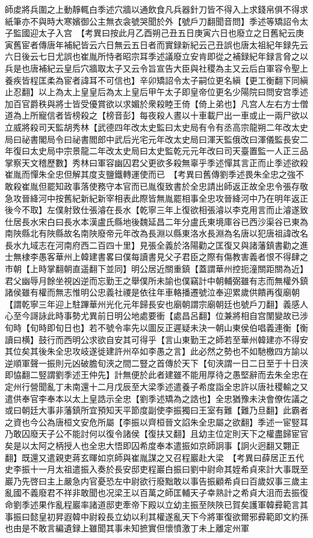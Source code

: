 師䖍將兵圍之上動靜輒白季述穴牆以通飲食凡兵器針刀皆不得入上求錢帛俱不得求紙筆亦不與時大寒嬪御公主無衣衾號哭聞於外【號戶刀翻聞音問】季述等矯詔令太子監國迎太子入宫　【考異曰按此月乙酉朔己丑五日庚寅六日也廢立之日舊紀云庚寅舊宦者傳唐年補紀皆云六日無云五日者而實録新紀云己丑誤也唐太祖紀年録先云六日後云七日尤誤也崔胤所恃者昭宗耳季述議廢立安肯即從之補録紀年録言脅之以兵是也唐補紀云皇后穴牆取太子又云令旨宣告大臣與社稷為主又云后白軍容令聖上養疾皆程匡柔為宦者諱耳不可信也】辛卯矯詔令太子嗣位更名縝【更工衡翻下同縝止忍翻】以上為太上皇皇后為太上皇后甲午太子即皇帝位更名少陽院曰問安宫季述加百官爵秩與將士皆受優賞欲以求媚於衆殺睦王倚【倚上弟也】凡宫人左右方士僧道為上所寵信者皆榜殺之【榜音彭】每夜殺人晝以十車載尸出一車或止一兩尸欲以立威將殺司天監胡秀林【武德四年改太史監曰太史局有令有丞高宗龍朔二年改太史局曰祕書閣局令曰祕書閻郎中武后光宅元年改太史局曰渾天監俄改曰渾儀監長安二年復曰太史局中宗景龍二年改太史局曰太史監乾元元年改曰司天臺置監一人正三品掌察天文稽歷數】秀林曰軍容幽囚君父更欲多殺無辜乎季述憚其言正而止季述欲殺崔胤而憚朱全忠但解其度支鹽鐵轉運使而已　【考異曰舊傳劉季述畏朱全忠之強不敢殺崔胤但罷知政事落使務守本官而已胤復致書於全忠請出師返正故全忠令張存敬急攻晉絳河中按舊紀新紀新宰相表此際皆無胤罷相事全忠攻晉絳河中乃在明年返正後今不取】左僕射致仕張濬在長水【乾寧三年上復欲相張濬以李克用言而止濬遂致仕居長水宋白曰長水本漢盧氏縣地後魏延昌二年分盧氏東境庫谷已西沙渠谷已東為南陜縣北有陜縣故名南陜廢帝元年改為長淵以縣東洛水長淵為名唐以犯唐祖諱改名長水九域志在河南府西二百四十里】見張全義於洛陽勸之匡復又與諸藩鎮書勸之進士無棣李愚客華州上韓建書畧曰僕每讀書見父子君臣之際有傷教害義者恨不得肆之市朝【上時掌翻朝直遥翻下並同】明公居近關重鎮【蓋謂華州控扼潼關距關為近】君父幽辱月餘坐視凶逆而忘勤王之舉僕所未諭也僕竊計中朝輔弼雖有志而無權外鎮諸侯雖有權而無志惟明公忠義社禝是依往年車輅播遷號泣奉迎累歲供饋再復廟朝【謂乾寧三年迎上駐蹕華州光化元年歸長安也廟朝謂宗廟朝廷也號戶刀翻】義感人心至今謌詠此時事勢尤異前日明公地處要衝【處昌呂翻】位兼將相自宫闈變故已涉旬時【旬時即旬日也】若不號令率先以圖反正遲疑未決一朝山東侯伯唱義連衡【衡讀曰横】鼓行而西明公求欲自安其可得乎【言山東勤王之師若至華州韓建亦不得安其位矣其後朱全忠攻岐遂徙建許州卒如李愚之言】此必然之勢也不如馳檄四方諭以逆順軍聲一振則元凶破膽旬浹之間二豎之首傳於天下【旬浹謂一日二日至于十日浹即恊翻二竪謂劉季述王仲先】計無便於此者建雖不能用厚待之愚堅辭而去朱全忠在定州行營聞亂丁未南還十二月戊辰至大梁季述遣養子希度詣全忠許以唐社稷輸之又遣供奉官李奉本以太上皇誥示全忠【劉季述矯為之誥也】全忠猶豫未決會僚佐議之或曰朝廷大事非藩鎮所宜預知天平節度副使李振獨曰王室有難【難乃旦翻】此霸者之資也今公為唐桓文安危所屬【李振以齊桓晉文諂朱全忠屬之欲翻】季述一宦竪耳乃敢囚廢天子公不能討何以復令諸侯【復扶又翻】且幼主位定則天下之權盡歸宦官矣是以太阿之柄授人也全忠大悟即囚希度奉本遣振如京師詗事【詗火迥翻又翾正翻】既還又遣親吏蔣玄暉如京師與崔胤謀之又召程巖赴大梁　【考異曰薛居正五代史李振十一月太祖遣振入奏於長安邸吏程巖白振曰劉中尉命其姪希貞來計大事既至巖乃先啓曰主上嚴急内官憂恐左中尉欲行廢黜敢以事告振顧希貞曰百歲奴事三歲主亂國不義廢君不祥非敢聞也况梁王以百萬之師匡輔天子幸熟計之希貞大沮而去振復命劉季述果作亂程巖率諸道邸吏牽帝下殿以立幼主振至陜陜已賀矣護軍韓彛範言其事振曰懿皇初昇遐韓中尉殺長立幼以利其權遂亂天下今將軍復欲爾邪彛範即文約孫也由是不敢言編遺録上雖聞其事未知摭實但懷憤激丁未上離定州軍